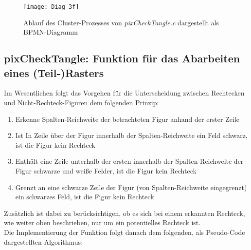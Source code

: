 \documentclass[
10pt, %
a4paper, %
oneside, %
headinclude,footinclude, %
BCOR5mm, %
]{scrartcl}
\begin{document}
\pagebreak

\begin{figure}[h]
	\centering 
	\texttt{[image: Diag\_3f]} 
	\caption[Funktionalität von \textit{pixCheckTangle.c} Cluster-Prozess]{Ablauf des Cluster-Prozesses von \textit{pixCheckTangle.c} dargestellt als BPMN-Diagramm }
	
\end{figure}



\subsection{pixCheckTangle: Funktion für das Abarbeiten eines (Teil-)Rasters}

Im Wesentlichen folgt das Vorgehen für die Unterscheidung zwischen Rechtecken und Nicht-Rechteck-Figuren dem folgenden Prinzip:

\begin{enumerate}[noitemsep]
	\item Erkenne Spalten-Reichweite der betrachteten Figur anhand der erster Zeile
	\item Ist In Zeile über der Figur innerhalb der Spalten-Reichweite ein Feld schwarz, ist die Figur kein Rechteck
	\item Enthält eine Zeile unterhalb der ersten innerhalb der Spalten-Reichweite der Figur schwarze und weiße Felder, ist die Figur kein Rechteck
	\item Grenzt an eine schwarze Zeile der Figur (von Spalten-Reichweite eingegrenzt) ein schwarzes Feld, ist die Figur kein Rechteck
\end{enumerate}
Zusätzlich ist dabei zu berücksichtigen, ob es sich bei einem erkannten Rechteck, wie weiter oben beschrieben, nur um ein potentielles Rechteck ist.\\
Die Implementierung der Funktion folgt danach dem folgenden, als Pseudo-Code dargestellten Algorithmus:\\
\end{document}
